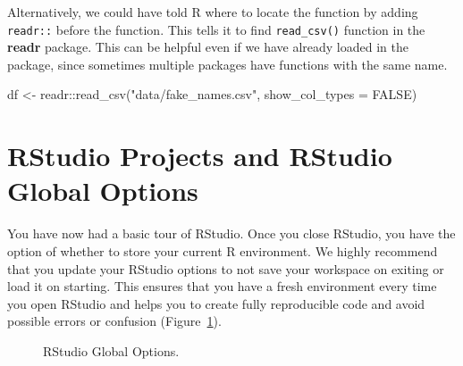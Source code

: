 \documentclass[
  letterpaper,
]{latex/krantz}
\makeatletter
\newenvironment{Shaded}{\begin{snugshade}}{\end{snugshade}}
\newcommand{\AttributeTok}[1]{\textcolor[rgb]{0.40,0.45,0.13}{#1}}
\newcommand{\ConstantTok}[1]{\textcolor[rgb]{0.56,0.35,0.01}{#1}}
\newcommand{\FunctionTok}[1]{\textcolor[rgb]{0.28,0.35,0.67}{#1}}
\newcommand{\NormalTok}[1]{\textcolor[rgb]{0.00,0.23,0.31}{#1}}
\newcommand{\OtherTok}[1]{\textcolor[rgb]{0.00,0.23,0.31}{#1}}
\newcommand{\SpecialCharTok}[1]{\textcolor[rgb]{0.37,0.37,0.37}{#1}}
\newcommand{\StringTok}[1]{\textcolor[rgb]{0.13,0.47,0.30}{#1}}
\newenvironment{kframe}{%
\medskip{}
\setlength{\fboxsep}{.8em}
 \def\at@end@of@kframe{}%
 \ifinner\ifhmode%
  \def\at@end@of@kframe{\end{minipage}}%
  \begin{minipage}{\columnwidth}%
 \fi\fi%
 \def\FrameCommand##1{\hskip\@totalleftmargin \hskip-\fboxsep
 \colorbox{shadecolor}{##1}\hskip-\fboxsep
     \hskip-\linewidth \hskip-\@totalleftmargin \hskip\columnwidth}%
 \MakeFramed {\advance\hsize-\width
   \@totalleftmargin\z@ \linewidth\hsize
   \@setminipage}}%
 {\par\unskip\endMakeFramed%
 \at@end@of@kframe}
\renewenvironment{Shaded}{\begin{kframe}}{\end{kframe}}
\makeatother
\begin{document}
Alternatively, we could have told R where to locate the function by
adding \texttt{readr::} before the function. This tells it to find
\texttt{read\_csv()} function in the \textbf{readr} package. This can be
helpful even if we have already loaded in the package, since sometimes
multiple packages have functions with the same name.

\begin{Shaded}
\begin{Highlighting}[]
\NormalTok{df }\OtherTok{\textless{}{-}}\NormalTok{ readr}\SpecialCharTok{::}\FunctionTok{read\_csv}\NormalTok{(}\StringTok{"data/fake\_names.csv"}\NormalTok{, }\AttributeTok{show\_col\_types =} \ConstantTok{FALSE}\NormalTok{)}
\end{Highlighting}
\end{Shaded}

\section{RStudio Projects and RStudio Global
Options}\label{rstudio-projects-and-rstudio-global-options}

You have now had a basic tour of RStudio. Once you close RStudio, you
have the option of whether to store your current R environment. We
highly recommend that you update your RStudio options
 to not save your workspace on exiting or
load it on starting. This ensures that you have a fresh environment
every time you open RStudio and helps you to create fully reproducible
code and avoid possible errors or confusion
(Figure~\ref{fig-global-options}).

\begin{figure}


\caption{\label{fig-global-options}RStudio Global Options.}

\end{figure}%
\end{document}
